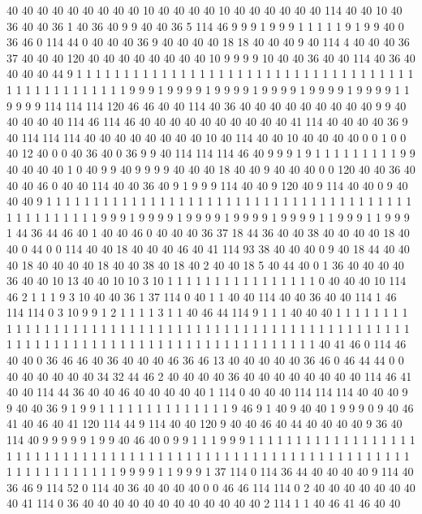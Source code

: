 40 40 40 40 40 40 40 40 40 10 40 40 40 40 10 40 40 40 40 40
40 114 40 40 10 40 36 40 40 36 1 40 36 40 9 9 40 40 36 5
114 46 9 9 9 1 9 9 9 1 1 1 1 1 9 1 9 9 40 0
36 46 0 114 44 0 40 40 40 36 9 40 40 40 40 18 18 40 40 40
9 40 114 4 40 40 40 36 37 40 40 40 120 40 40 40 40 40 40 40
40 10 9 9 9 9 10 40 40 36 40 40 114 40 36 40 40 40 40 44
9 1 1 1 1 1 1 1 1 1 1 1 1 1 1 1 1 1 1 1
1 1 1 1 1 1 1 1 1 1 1 1 1 1 1 1 1 1 1 1
1 1 1 1 1 1 1 1 1 1 9 9 9 1 9 9 9 9 1 9
9 9 9 1 9 9 9 9 1 9 9 9 9 1 9 9 9 9 1 1
9 9 9 9 114 114 114 120 46 46 40 40 114 40 36 40 40 40 40 40
40 40 40 40 9 9 40 40 40 40 40 114 46 114 46 40 40 40 40 40
40 40 40 40 40 41 114 40 40 40 40 36 9 40 114 114 114 40 40 40
40 40 40 40 40 10 40 114 40 40 10 40 40 40 40 0 0 1 0 0
40 12 40 0 0 40 36 40 0 36 9 9 40 114 114 114 46 40 9 9
9 1 9 1 1 1 1 1 1 1 1 1 9 9 40 40 40 40 1 0
40 9 9 40 9 9 9 9 40 40 40 18 40 40 9 40 40 40 0 0
120 40 40 36 40 40 40 46 0 40 40 114 40 40 36 40 9 1 9 9
9 114 40 40 9 120 40 9 114 40 40 0 9 40 40 40 9 1 1 1
1 1 1 1 1 1 1 1 1 1 1 1 1 1 1 1 1 1 1 1
1 1 1 1 1 1 1 1 1 1 1 1 1 1 1 1 1 1 1 1
1 1 1 1 1 1 9 9 9 1 9 9 9 9 1 9 9 9 9 1
9 9 9 9 1 9 9 9 9 1 1 9 9 9 1 1 9 9 9 1
44 36 44 46 40 1 40 40 46 0 40 40 40 36 37 18 44 36 40 40
38 40 40 40 40 18 40 40 0 44 0 0 114 40 40 18 40 40 40 46
40 41 114 93 38 40 40 40 0 9 40 18 44 40 40 40 18 40 40 40
40 18 40 40 38 40 18 40 2 40 40 18 5 40 44 40 0 1 36 40
40 40 40 36 40 40 10 13 40 40 10 10 3 10 1 1 1 1 1 1
1 1 1 1 1 1 1 1 1 1 0 40 40 40 10 114 46 2 1 1
1 9 3 10 40 40 36 1 37 114 0 40 1 1 40 40 114 40 40 36
40 40 114 1 46 114 114 0 3 10 9 9 1 2 1 1 1 1 3 1
1 40 46 44 114 9 1 1 1 40 40 40 1 1 1 1 1 1 1 1
1 1 1 1 1 1 1 1 1 1 1 1 1 1 1 1 1 1 1 1
1 1 1 1 1 1 1 1 1 1 1 1 1 1 1 1 1 1 1 1
1 1 1 1 1 1 1 1 1 1 1 1 1 1 1 1 1 1 1 1
1 1 1 1 1 1 1 1 1 1 1 1 1 1 1 1 40 41 46 0
114 46 40 40 0 36 46 46 40 36 40 40 40 46 36 46 13 40 40 40
40 40 36 46 0 46 44 44 0 0 40 40 40 40 40 40 34 32 44 46
2 40 40 40 40 36 40 40 40 40 40 40 40 40 114 46 41 40 40 114
44 36 40 40 46 40 40 40 40 40 1 114 0 40 40 40 114 114 114 40
40 40 9 9 40 40 36 9 1 9 9 1 1 1 1 1 1 1 1 1
1 1 1 1 1 9 46 9 1 40 9 40 40 1 9 9 9 0 9 40
46 41 40 46 40 41 120 114 44 9 114 40 40 120 9 40 40 46 40 44
40 40 40 40 9 36 40 114 40 9 9 9 9 9 1 9 9 40 46 40
0 9 9 1 1 1 9 9 9 1 1 1 1 1 1 1 1 1 1 1
1 1 1 1 1 1 1 1 1 1 1 1 1 1 1 1 1 1 1 1
1 1 1 1 1 1 1 1 1 1 1 1 1 1 1 1 1 1 1 1
1 1 1 1 1 1 1 1 1 1 1 1 1 1 1 1 1 1 1 1
1 1 9 9 9 9 1 1 9 9 9 1 37 114 0 114 36 44 40 40
40 40 9 114 40 36 46 9 114 52 0 114 40 36 40 40 40 40 0 0
46 46 114 114 0 2 40 40 40 40 40 40 40 40 41 114 0 36 40 40
40 40 40 40 40 40 40 40 40 40 2 114 1 1 40 46 41 46 40 40
